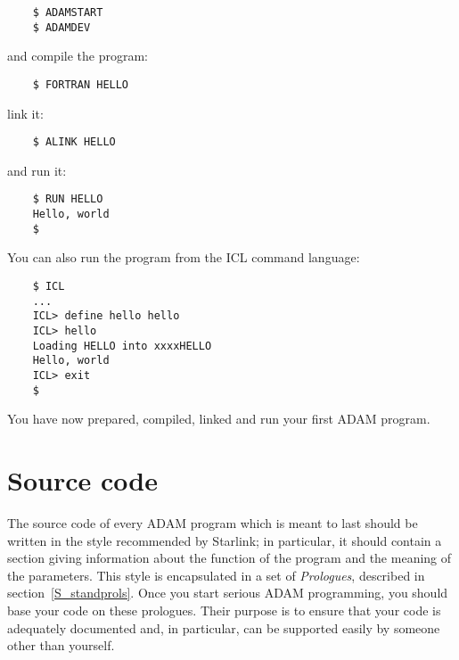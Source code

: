 \begin{small}
\begin{verbatim}
    $ ADAMSTART
    $ ADAMDEV
\end{verbatim}
\end{small}

and compile the program:

\begin{small}
\begin{verbatim}
    $ FORTRAN HELLO
\end{verbatim}
\end{small}

link it:

\begin{small}
\begin{verbatim}
    $ ALINK HELLO
\end{verbatim}
\end{small}

and run it:

\begin{small}
\begin{verbatim}
    $ RUN HELLO
    Hello, world
    $
\end{verbatim}
\end{small}

You can also run the program from the ICL command language:

\begin{small}
\begin{verbatim}
    $ ICL
    ...
    ICL> define hello hello
    ICL> hello
    Loading HELLO into xxxxHELLO
    Hello, world
    ICL> exit
    $
\end{verbatim}
\end{small}

You have now prepared, compiled, linked and run your first ADAM program.

\section{Source code}
\label{S_prog2}

The source code of every ADAM program which is meant to last should be written
in the style recommended by Starlink; in particular, it should contain a section
giving information about the function of the program and the meaning of the
parameters.
This style is encapsulated in a set of {\em Prologues}, described in
section~\ref{S_standprols}.
Once you start serious ADAM programming, you should base your code on these
prologues.
Their purpose is to ensure that your code is adequately documented and, in
particular, can be supported easily by someone other than yourself.

